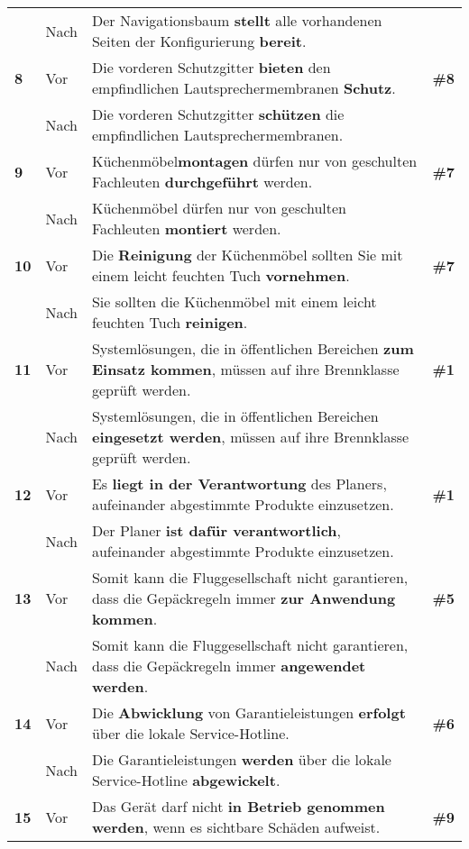 \begin{longtable}{llp{}l}
& Nach & Der Navigationsbaum \textbf{stellt} alle vorhandenen Seiten der Konfigurierung \textbf{bereit}. & \\
\tablevspace
{ \textbf{8}} & Vor & Die vorderen Schutzgitter \textbf{bieten} den empfindlichen Lautsprechermembranen \textbf{Schutz}. & \textbf{\#8}\\
& Nach & Die vorderen Schutzgitter \textbf{schützen} die empfindlichen Lautsprechermembranen. & \\
\tablevspace
{ \textbf{9}} & Vor & Küchenmöbel\textbf{montagen} dürfen nur von geschulten Fachleuten \textbf{durchgeführt} werden. & \textbf{\#7}\\
& Nach & Küchenmöbel dürfen nur von geschulten Fachleuten \textbf{montiert} werden. & \\
\tablevspace
{ \textbf{10}} & Vor & Die \textbf{Reinigung} der Küchenmöbel sollten Sie mit einem leicht feuchten Tuch \textbf{vornehmen}. & \textbf{\#7}\\
& Nach & Sie sollten die Küchenmöbel mit einem leicht feuchten Tuch \textbf{reinigen}. & \\
\tablevspace
{ \textbf{11}} & Vor & Systemlösungen, die in öffentlichen Bereichen \textbf{zum Einsatz kommen}, müssen auf ihre Brennklasse geprüft werden. & \textbf{\#1}\\
& Nach & Systemlösungen, die in öffentlichen Bereichen \textbf{eingesetzt werden}, müssen auf ihre Brennklasse geprüft werden. & \\
\tablevspace
{ \textbf{12}} & Vor & Es \textbf{liegt in der Verantwortung} des Planers, aufeinander abgestimmte Produkte einzusetzen. & \textbf{\#1}\\
& Nach & Der Planer \textbf{ist dafür verantwortlich}, aufeinander abgestimmte Produkte einzusetzen. & \\
\tablevspace
{ \textbf{13}} & Vor & Somit kann die Fluggesellschaft nicht garantieren, dass die Gepäckregeln immer \textbf{zur Anwendung kommen}. & \textbf{\#5}\\
& Nach & Somit kann die Fluggesellschaft nicht garantieren, dass die Gepäckregeln immer \textbf{angewendet werden}. & \\
\tablevspace
{ \textbf{14}} & Vor & Die \textbf{Abwicklung} von Garantieleistungen \textbf{erfolgt} über die lokale Service-Hotline. & \textbf{\#6}\\
& Nach & Die Garantieleistungen \textbf{werden} über die lokale Service-Hotline \textbf{abgewickelt}. & \\
\tablevspace
{ \textbf{15}} & Vor & Das Gerät darf nicht \textbf{in Betrieb genommen werden}, wenn es sichtbare Schäden aufweist. & \textbf{\#9}\\

\end{longtable}
